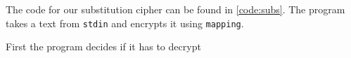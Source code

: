 The code for our substitution cipher can be found in \autoref{code:subs}. The program takes a text from \lstinline{stdin} and encrypts it using \lstinline{mapping}.

First the program decides if it has to decrypt


